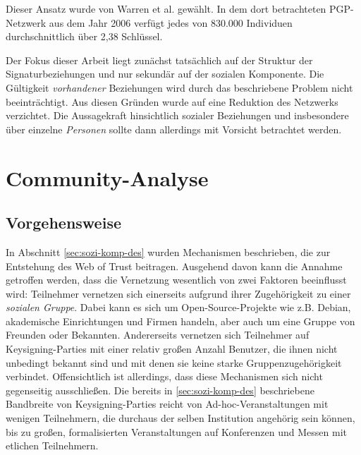 Dieser Ansatz wurde von Warren et al.\cite{Warren2007} gewählt. In
dem dort betrachteten PGP-Netzwerk aus dem Jahr 2006 verfügt jedes
von 830.000 Individuen durchschnittlich über 2,38 Schlüssel.

Der Fokus dieser Arbeit liegt zunächst tatsächlich auf der Struktur
der Signaturbeziehungen und nur sekundär auf der sozialen
Komponente. Die Gültigkeit \emph{vorhandener} Beziehungen wird durch
das beschriebene Problem nicht beeintr\"achtigt. Aus diesen Gründen
wurde auf eine Reduktion des Netzwerks verzichtet. Die Aussagekraft
hinsichtlich sozialer Beziehungen und insbesondere über einzelne
\emph{Personen} sollte dann allerdings mit Vorsicht betrachtet werden.

\section{Community-Analyse}
\label{sec:community-analyse}

\subsection{Vorgehensweise}
\label{sec:vorgehensweise}

In Abschnitt \ref{sec:sozi-komp-des} wurden Mechanismen beschrieben,
die zur Entstehung des Web of Trust beitragen. Ausgehend davon kann
die Annahme getroffen werden, dass die Vernetzung wesentlich von zwei
Faktoren beeinflusst wird: Teilnehmer vernetzen sich einerseits
aufgrund ihrer Zugehörigkeit zu einer \emph{sozialen Gruppe}. Dabei
kann es sich um Open-Source-Projekte wie z.B. Debian, akademische
Einrichtungen und Firmen handeln, aber auch um eine Gruppe von
Freunden oder Bekannten. Andererseits vernetzen sich Teilnehmer auf
Keysigning-Parties mit einer relativ großen Anzahl Benutzer, die
ihnen nicht unbedingt bekannt sind und mit denen sie keine starke
Gruppenzugehörigkeit verbindet. Offensichtlich ist allerdings, dass
diese Mechanismen sich nicht gegenseitig ausschließen. Die bereits in
\ref{sec:sozi-komp-des} beschriebene Bandbreite von Keysigning-Parties
reicht von Ad-hoc-Veranstaltungen mit wenigen Teilnehmern, die
durchaus der selben Institution angehörig sein können, bis zu
großen, formalisierten Veranstaltungen auf Konferenzen und Messen mit
etlichen Teilnehmern.


